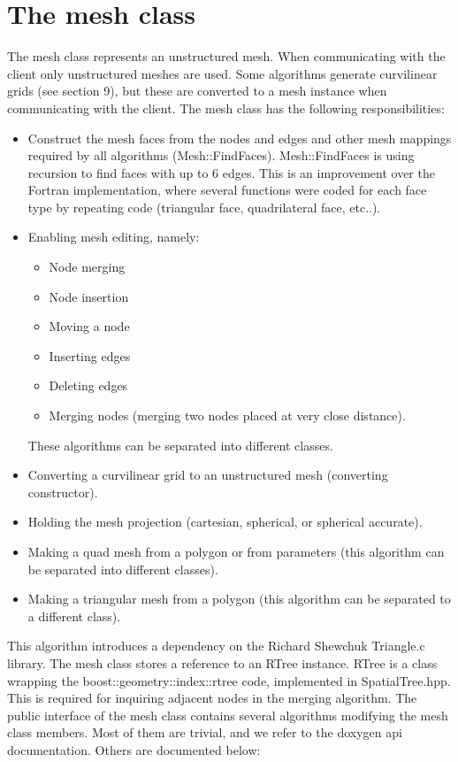 \documentclass[biblatex]{deltares_manual}
\begin{document}
\chapter{The mesh class}

The mesh class represents an unstructured mesh. When communicating with the client only unstructured meshes are used. Some algorithms generate curvilinear grids (see section 9), but these are converted to a mesh instance when communicating with the client. The mesh class has the following responsibilities:
\begin{itemize}
\item Construct the mesh faces from the nodes and edges and other mesh mappings required by all algorithms (Mesh::FindFaces). Mesh::FindFaces is using recursion to find faces with up to 6 edges. This is an improvement over the Fortran implementation, where several functions were coded for each face type by repeating code (triangular face, quadrilateral face, etc..).
\item Enabling mesh editing, namely:
\begin{itemize}
\item Node merging
\item Node insertion
\item Moving a node
\item Inserting edges
\item Deleting edges
\item Merging nodes (merging two nodes placed at very close distance).
\end{itemize}
These algorithms can be separated into different classes.
\item Converting a curvilinear grid to an unstructured mesh (converting constructor).
\item Holding the mesh projection (cartesian, spherical, or spherical accurate).
\item Making a quad mesh from a polygon or from parameters (this algorithm can be separated into different classes).
\item Making a triangular mesh from a polygon (this algorithm can be separated to a different class).
\end{itemize}
This algorithm introduces a dependency on the Richard Shewchuk Triangle.c library.
The mesh class stores a reference to an RTree instance. RTree is a class wrapping the boost::geometry::index::rtree code, implemented in SpatialTree.hpp. This is required for inquiring adjacent nodes in the merging algorithm.
The public interface of the mesh class contains several algorithms modifying the mesh class members. Most of them are trivial, and we refer to the doxygen api documentation. Others are documented below:
\end{document}
